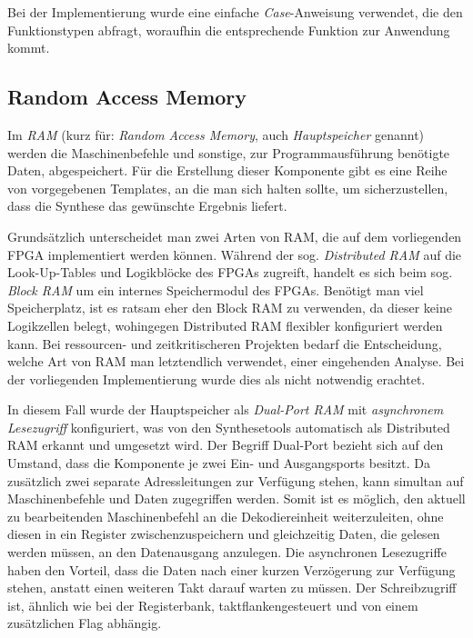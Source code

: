 Bei der Implementierung wurde eine einfache \textit{Case}-Anweisung verwendet, die den Funktionstypen abfragt, woraufhin die entsprechende Funktion zur Anwendung kommt.

\subsection{Random Access Memory}
\label{subsec:RAM}

Im \textit{RAM} (kurz für: \textit{Random Access Memory}, auch \textit{Hauptspeicher} genannt) werden die Maschinenbefehle und sonstige, zur Programmausführung benötigte Daten, abgespeichert.
Für die Erstellung dieser Komponente gibt es eine Reihe von vorgegebenen Templates, an die man sich halten sollte, um sicherzustellen, dass die Synthese das gewünschte Ergebnis liefert.~\cite[S. 243 ff.]{Chu}

Grundsätzlich unterscheidet man zwei Arten von RAM, die auf dem vorliegenden FPGA implementiert werden können.
Während der sog. \textit{Distributed RAM} auf die Look-Up-Tables und Logikblöcke des FPGAs zugreift, handelt es sich beim sog. \textit{Block RAM} um ein internes Speichermodul des FPGAs.
Benötigt man viel Speicherplatz, ist es ratsam eher den Block RAM zu verwenden, da dieser keine Logikzellen belegt, wohingegen Distributed RAM flexibler konfiguriert werden kann.
Bei ressourcen- und zeitkritischeren Projekten bedarf die Entscheidung, welche Art von RAM man letztendlich verwendet, einer eingehenden Analyse. Bei der vorliegenden Implementierung wurde dies als nicht notwendig erachtet.


In diesem Fall wurde der Hauptspeicher als \textit{Dual-Port RAM} mit \textit{asynchronem Lesezugriff} konfiguriert, was von den Synthesetools automatisch als Distributed RAM erkannt und umgesetzt wird.
Der Begriff Dual-Port bezieht sich auf den Umstand, dass die Komponente je zwei Ein- und Ausgangsports besitzt.
Da zusätzlich zwei separate Adressleitungen zur Verfügung stehen, kann simultan auf Maschinenbefehle und Daten zugegriffen werden.
Somit ist es möglich, den aktuell zu bearbeitenden Maschinenbefehl an die Dekodiereinheit weiterzuleiten, ohne diesen in ein Register zwischenzuspeichern und gleichzeitig Daten, die gelesen werden müssen, an den Datenausgang anzulegen.
Die asynchronen Lesezugriffe haben den Vorteil, dass die Daten nach einer kurzen Verzögerung zur Verfügung stehen, anstatt einen weiteren Takt darauf warten zu müssen.
Der Schreibzugriff ist, ähnlich wie bei der Registerbank, taktflankengesteuert und von einem zusätzlichen Flag abhängig.

